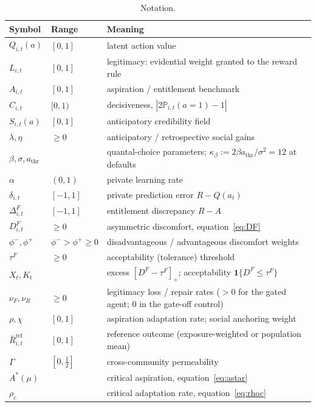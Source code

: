 \documentclass[11pt]{article}
\newcommand{\Prob}{\mathbb{P}}
\newcommand{\1}{\mathbf{1}}
\newcommand{\Astar}{A^{*}}
\begin{document}
\begin{table}[H]\centering\small
\caption{Notation.}
\label{tab:notation}
\begin{tabular}{llp{8.6cm}}
\toprule
Symbol & Range & Meaning \\
\midrule
$Q_{i,t}(a)$ & $[0,1]$ & latent action value \\
$L_{i,t}$ & $[0,1]$ & legitimacy: evidential weight granted to the reward rule \\
$A_{i,t}$ & $[0,1]$ & aspiration / entitlement benchmark \\
$C_{i,t}$ & $[0,1)$ & decisiveness, $|2\Prob_{i,t}(a{=}1)-1|$ \\
$S_{i,t}(a)$ & $[0,1]$ & anticipatory credibility field \\
$\lambda,\eta$ & $\ge0$ & anticipatory / retrospective social gains \\
$\beta,\sigma,a_{\mathrm{thr}}$ & & quantal-choice parameters; $\kappa_\beta:=2\beta a_{\mathrm{thr}}/\sigma^2=12$ at defaults \\
$\alpha$ & $(0,1)$ & private learning rate \\
$\delta_{i,t}$ & $[-1,1]$ & private prediction error $R-Q(a_t)$ \\
$\Delta^F_{i,t}$ & $[-1,1]$ & entitlement discrepancy $R-A$ \\
$D^F_{i,t}$ & $\ge0$ & asymmetric discomfort, equation~\eqref{eq:DF} \\
$\phi^-,\phi^+$ & $\phi^->\phi^+\ge0$ & disadvantageous / advantageous discomfort weights \\
$\tau^F$ & $\ge0$ & acceptability (tolerance) threshold \\
$X_t,K_t$ & & excess $[D^F-\tau^F]_+$; acceptability $\1\{D^F\le\tau^F\}$ \\
$\nu_F,\nu_R$ & $\ge0$ & legitimacy loss / repair rates ($>0$ for the gated agent; $0$ in the gate-off control) \\
$\rho,\chi$ & $[0,1]$ & aspiration adaptation rate; social anchoring weight \\
$\bar R^{\mathrm{ref}}_{i,t}$ & $[0,1]$ & reference outcome (exposure-weighted or population mean) \\
$\Gamma$ & $[0,\tfrac12]$ & cross-community permeability \\
$\Astar(\mu)$ & & critical aspiration, equation~\eqref{eq:astar} \\
$\rho_c$ & & critical adaptation rate, equation~\eqref{eq:rhoc} \\
\bottomrule
\end{tabular}
\end{table}
\end{document}
